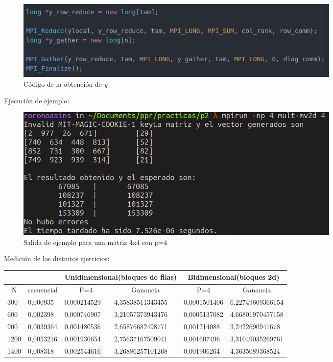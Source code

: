 \begin{figure}[H]
\centering
\includegraphics[width=0.8\textwidth]{imagenes/yfinal.png}
\caption{Código de la obtención de \textit{y}}
\end{figure}

Ejecución de ejemplo:

\begin{figure}[H]
\centering
\includegraphics[width=0.8\textwidth]{imagenes/matrix.png}
\caption{Salida de ejemplo para una matriz 4x4 con p=4}
\end{figure}

Medición de los distintos ejercicios:

\begin{table}[H]
\begin{tabular}{ll|l|l|l|l|}
\cline{3-6}
                           &                                 & \multicolumn{2}{c|}{Unidimensional(bloques de filas)}    & \multicolumn{2}{c|}{Bidimensional(bloques 2d)}           \\ \hline
\multicolumn{1}{|c|}{N}    & \multicolumn{1}{c|}{secuencial} & \multicolumn{1}{c|}{P=4} & \multicolumn{1}{c|}{Ganancia} & \multicolumn{1}{c|}{P=4} & \multicolumn{1}{c|}{Ganancia} \\ \hline
\multicolumn{1}{|l|}{300}  & 0,000935                        & 0,000214529              & 4,35838511343455              & 0,0001501406             & 6,22749609366154              \\ \hline
\multicolumn{1}{|l|}{600}  & 0,002398                        & 0,000746907              & 3,21057373943476              & 0,0005137082             & 4,66801970457158              \\ \hline
\multicolumn{1}{|l|}{900}  & 0,0039364                       & 0,001480536              & 2,65876682498771              & 0,001214088              & 3,2422690941678               \\ \hline
\multicolumn{1}{|l|}{1200} & 0,0053216                       & 0,001930654              & 2,75637167509041              & 0,001607496              & 3,31049035269761              \\ \hline
\multicolumn{1}{|l|}{1400} & 0,008318                        & 0,002544616              & 3,26886257101268              & 0,001906264              & 4,3635089368524               \\ \hline
\end{tabular}
\end{table}

